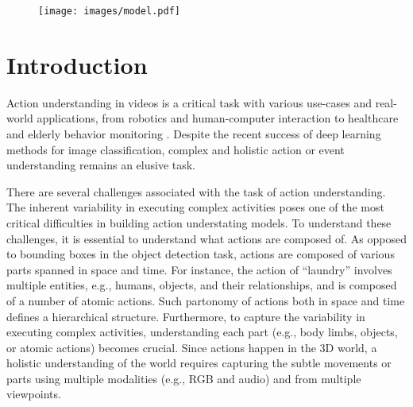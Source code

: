 \documentclass[final]{cvpr}
\begin{document}
\begin{figure}
\begin{center}
    \centering
    \vspace{-10pt}
    \texttt{[image: images/model.pdf]}
    \vspace{-15pt}
    \label{intuition}
    \vspace{-20pt}
    \centering
\end{center}
\end{figure}

\section{Introduction}

Action understanding in videos is a critical task with various use-cases and real-world applications, from robotics \cite{rezazadegan2017action, liu2020spatiotemporal} and human-computer interaction \cite{santini2017calibme} to healthcare \cite{haque2020illuminating, lu2020vision} and elderly behavior monitoring \cite{jalal2017depth, luo2018computer}. Despite the recent success of deep learning methods for image classification, complex and holistic action or event understanding remains an elusive task.

There are several challenges associated with the task of action understanding. The inherent variability in executing complex activities poses one of the most critical difficulties in building action understating models. To understand these challenges, it is essential to understand what actions are composed of. As opposed to bounding boxes in the object detection task, actions are composed of various parts spanned in space and time. For instance, the action of ``laundry'' involves multiple entities, e.g., humans, objects, and their relationships, and is composed of a number of atomic actions. Such partonomy of actions \cite{blanke2010remember, zacks2001event, action_genome} both in space and time defines a hierarchical structure. Furthermore, to capture the variability in executing complex activities, understanding each part (e.g., body limbs, objects, or atomic actions) becomes crucial. Since actions happen in the 3D world, a holistic understanding of the world requires capturing the subtle movements or parts using multiple modalities (e.g., RGB and audio) and from multiple viewpoints.
\end{document}

